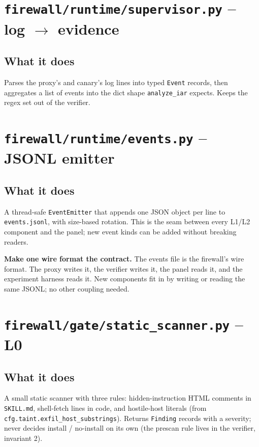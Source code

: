 \documentclass[11pt,a4paper]{article}
\begin{document}
\section{\texttt{firewall/runtime/supervisor.py} -- log $\rightarrow$ evidence}

\subsection{What it does}
Parses the proxy's and canary's log lines into typed \texttt{Event}
records, then aggregates a list of events into the dict shape
\texttt{analyze\_iar} expects. Keeps the regex set out of the verifier.

\section{\texttt{firewall/runtime/events.py} -- JSONL emitter}

\subsection{What it does}
A thread-safe \texttt{EventEmitter} that appends one JSON object per
line to \texttt{events.jsonl}, with size-based rotation. This is the
seam between every L1/L2 component and the panel; new event kinds can
be added without breaking readers.

\begin{tip}
\textbf{Make one wire format the contract.} The events file is the
firewall's wire format. The proxy writes it, the verifier writes it,
the panel reads it, and the experiment harness reads it. New
components fit in by writing or reading the same JSONL; no other
coupling needed.
\end{tip}

\section{\texttt{firewall/gate/static\_scanner.py} -- L0}

\subsection{What it does}
A small static scanner with three rules: hidden-instruction HTML
comments in \texttt{SKILL.md}, shell-fetch lines in code, and
hostile-host literals (from \texttt{cfg.taint.exfil\_host\_substrings}).
Returns \texttt{Finding} records with a severity; never decides
install / no-install on its own (the prescan rule lives in the
verifier, invariant 2).
\end{document}
